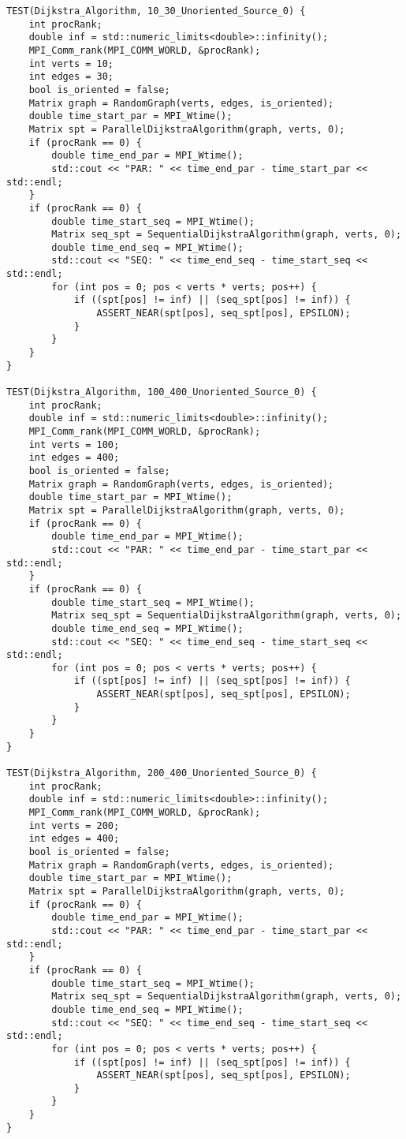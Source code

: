 \documentclass{report}
\begin{document}
\begin{lstlisting}
TEST(Dijkstra_Algorithm, 10_30_Unoriented_Source_0) {
    int procRank;
    double inf = std::numeric_limits<double>::infinity();
    MPI_Comm_rank(MPI_COMM_WORLD, &procRank);
    int verts = 10;
    int edges = 30;
    bool is_oriented = false;
    Matrix graph = RandomGraph(verts, edges, is_oriented);
    double time_start_par = MPI_Wtime();
    Matrix spt = ParallelDijkstraAlgorithm(graph, verts, 0);
    if (procRank == 0) {
        double time_end_par = MPI_Wtime();
        std::cout << "PAR: " << time_end_par - time_start_par << std::endl;
    }
    if (procRank == 0) {
        double time_start_seq = MPI_Wtime();
        Matrix seq_spt = SequentialDijkstraAlgorithm(graph, verts, 0);
        double time_end_seq = MPI_Wtime();
        std::cout << "SEQ: " << time_end_seq - time_start_seq << std::endl;
        for (int pos = 0; pos < verts * verts; pos++) {
            if ((spt[pos] != inf) || (seq_spt[pos] != inf)) {
                ASSERT_NEAR(spt[pos], seq_spt[pos], EPSILON);
            }
        }
    }
}

TEST(Dijkstra_Algorithm, 100_400_Unoriented_Source_0) {
    int procRank;
    double inf = std::numeric_limits<double>::infinity();
    MPI_Comm_rank(MPI_COMM_WORLD, &procRank);
    int verts = 100;
    int edges = 400;
    bool is_oriented = false;
    Matrix graph = RandomGraph(verts, edges, is_oriented);
    double time_start_par = MPI_Wtime();
    Matrix spt = ParallelDijkstraAlgorithm(graph, verts, 0);
    if (procRank == 0) {
        double time_end_par = MPI_Wtime();
        std::cout << "PAR: " << time_end_par - time_start_par << std::endl;
    }
    if (procRank == 0) {
        double time_start_seq = MPI_Wtime();
        Matrix seq_spt = SequentialDijkstraAlgorithm(graph, verts, 0);
        double time_end_seq = MPI_Wtime();
        std::cout << "SEQ: " << time_end_seq - time_start_seq << std::endl;
        for (int pos = 0; pos < verts * verts; pos++) {
            if ((spt[pos] != inf) || (seq_spt[pos] != inf)) {
                ASSERT_NEAR(spt[pos], seq_spt[pos], EPSILON);
            }
        }
    }
}

TEST(Dijkstra_Algorithm, 200_400_Unoriented_Source_0) {
    int procRank;
    double inf = std::numeric_limits<double>::infinity();
    MPI_Comm_rank(MPI_COMM_WORLD, &procRank);
    int verts = 200;
    int edges = 400;
    bool is_oriented = false;
    Matrix graph = RandomGraph(verts, edges, is_oriented);
    double time_start_par = MPI_Wtime();
    Matrix spt = ParallelDijkstraAlgorithm(graph, verts, 0);
    if (procRank == 0) {
        double time_end_par = MPI_Wtime();
        std::cout << "PAR: " << time_end_par - time_start_par << std::endl;
    }
    if (procRank == 0) {
        double time_start_seq = MPI_Wtime();
        Matrix seq_spt = SequentialDijkstraAlgorithm(graph, verts, 0);
        double time_end_seq = MPI_Wtime();
        std::cout << "SEQ: " << time_end_seq - time_start_seq << std::endl;
        for (int pos = 0; pos < verts * verts; pos++) {
            if ((spt[pos] != inf) || (seq_spt[pos] != inf)) {
                ASSERT_NEAR(spt[pos], seq_spt[pos], EPSILON);
            }
        }
    }
}


\end{lstlisting}
\end{document}

